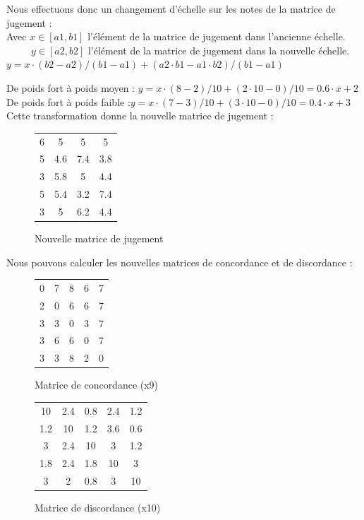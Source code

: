 Nous effectuons donc un changement d’échelle sur les notes de la matrice de
jugement : \\
Avec $x\in[a1,b1]$ l’élément de la matrice de jugement dans l’ancienne échelle. \\
~~~~~$y\in[a2,b2]$ l’élément de la matrice de jugement dans la nouvelle échelle. \\
$y = x\cdot(b2-a2)/(b1-a1) + (a2\cdot b1-a1\cdot b2)/(b1-a1)$

De poids fort à poids moyen : $y = x\cdot(8-2)/10 + (2\cdot 10-0)/10 = 0.6\cdot x + 2$ \\
De poids fort à poids faible :$y = x\cdot(7-3)/10 + (3\cdot 10-0)/10 = 0.4\cdot x+ 3$ \\

Cette transformation donne la nouvelle matrice de jugement : \\
\begin{figure}
    \begin{center}
        \begin{tabular}{|c c c c|}
            6&5&5&5\\
            5&4.6&7.4&3.8\\
            3&5.8&5&4.4\\
            5&5.4&3.2&7.4\\
            3&5&6.2&4.4\\
        \end{tabular}
        \caption{Nouvelle matrice de jugement}
    \end{center}
\end{figure}

Nous pouvons calculer les nouvelles matrices de concordance et de discordance : \\
\begin{figure}
    \begin{center}
        \begin{tabular}{|c c c c c|}
            0&7&8&6&7\\
            2&0&6&6&7\\
            3&3&0&3&7\\
            3&6&6&0&7\\
            3&3&8&2&0\\
        \end{tabular}
        \caption{Matrice de concordance (x9)}
    \end{center}
\end{figure}

\begin{figure}
    \begin{center}
        \begin{tabular}{|c c c c c|}
            10&2.4&0.8&2.4&1.2\\
            1.2&10&1.2&3.6&0.6\\
            3&2.4&10&3&1.2\\
            1.8&2.4&1.8&10&3\\
            3&2&0.8&3&10\\
        \end{tabular}
        \caption{Matrice de discordance (x10)}
    \end{center}
\end{figure}

